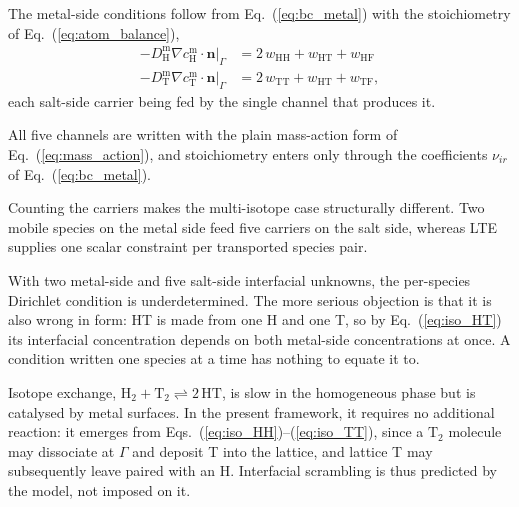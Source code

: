 \documentclass[5p]{elsarticle}
\newcommand{\cm}[1]{c^{\mathrm{m}}_{#1}}   %
\begin{document}
The metal-side conditions follow from Eq.~(\ref{eq:bc_metal}) with the stoichiometry of Eq.~(\ref{eq:atom_balance}),
\begin{align}
    -D^{\mathrm{m}}_\mathrm{H}\nabla \cm{\mathrm{H}}\cdot\mathbf{n}\big|_\Gamma
        &= 2\,w_{\mathrm{HH}} + w_{\mathrm{HT}} + w_{\mathrm{HF}}
    \label{eq:iso_flux_H}\\
    -D^{\mathrm{m}}_\mathrm{T}\nabla \cm{\mathrm{T}}\cdot\mathbf{n}\big|_\Gamma
        &= 2\,w_{\mathrm{TT}} + w_{\mathrm{HT}} + w_{\mathrm{TF}} ,
    \label{eq:iso_flux_T}
\end{align}
each salt-side carrier being fed by the single channel that produces it.

All five channels are written with the plain mass-action form of Eq.~(\ref{eq:mass_action}), and stoichiometry enters only through the coefficients $\nu_{ir}$ of Eq.~(\ref{eq:bc_metal}).

Counting the carriers makes the multi-isotope case structurally different.
Two mobile species on the metal side feed five carriers on the salt side, whereas LTE supplies one scalar constraint per transported species pair. 

With two metal-side and five salt-side interfacial unknowns, the per-species Dirichlet condition is underdetermined.
The more serious objection is that it is also wrong in form: HT is made from one H and one T, so by Eq.~(\ref{eq:iso_HT}) its interfacial concentration depends on both metal-side concentrations at once. 
A condition written one species at a time has nothing to equate it to.

Isotope exchange, $\mathrm{H_2} + \mathrm{T_2} \rightleftharpoons 2\,\mathrm{HT}$, is slow in the homogeneous phase but is catalysed by metal surfaces. 
In the present framework, it requires no additional reaction: it emerges from Eqs.~(\ref{eq:iso_HH})--(\ref{eq:iso_TT}), since a $\mathrm{T_2}$ molecule may dissociate at $\Gamma$ and deposit T into the lattice, and lattice T may subsequently leave paired with an H.
Interfacial scrambling is thus predicted by the model, not imposed on it.
\end{document}
